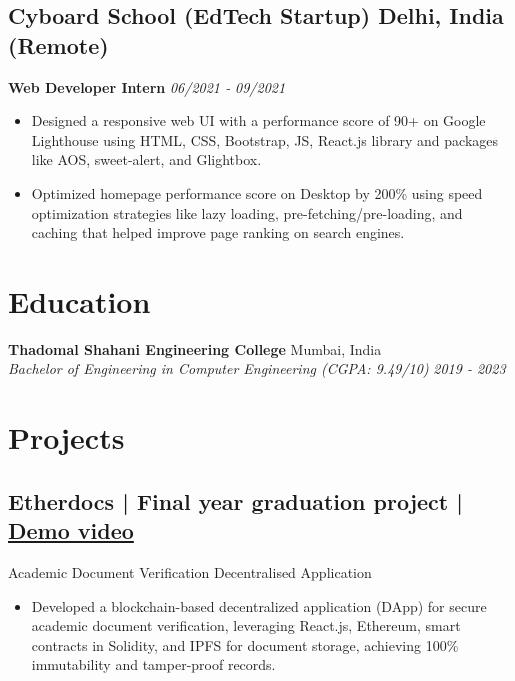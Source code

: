 \documentclass[a4,10pt]{article}
\newcommand{\subtext}[1]{
#1\par\vspace{-0.2cm}}
\newenvironment{zitemize}{
\begin{itemize}\itemsep0pt \parskip0pt \parsep1pt}
{\end{itemize}\vspace{-0.5cm}}
\begin{document}
\subsection*{Cyboard School (EdTech Startup) \hfill {\normalsize\normalfont Delhi, India (Remote)}}

\textbf{Web Developer Intern} \hfill \textit{06/2021 ‑ 09/2021} \\
\vspace{-5pt}
\begin{zitemize}
    \item Designed a responsive web UI with a performance score of 90+ on Google Lighthouse using HTML, CSS, Bootstrap, JS, React.js library and packages like AOS, sweet-alert, and Glightbox. 
    \item Optimized homepage performance score on Desktop by 200\% using speed optimization strategies like lazy loading, pre-fetching/pre-loading, and caching that helped improve page ranking on search engines.
\end{zitemize}




\vspace{-5pt}
\section*{Education}

\textbf{Thadomal Shahani Engineering College} \hfill Mumbai, India \\
\textit{Bachelor of Engineering in Computer Engineering (CGPA: 9.49/10)} \hfill \textit{2019 - 2023}

\vspace{-10pt}
\section*{Projects} 

\subsection*{Etherdocs | Final year graduation project \hfill {\normalsize{} | {\href{https://youtu.be/B_44aJ9hh6U?si=dGItpsQ3AEo_eIxk}{Demo video}}}}
\subtext{{\normalsize\normalfont Academic Document Verification Decentralised Application}}
\begin{zitemize}
    \item Developed a blockchain-based decentralized application (DApp) for secure academic document verification, leveraging React.js, Ethereum, smart contracts in Solidity, and IPFS for document storage, achieving 100\% immutability and tamper-proof records.
\end{zitemize}
\end{document}
